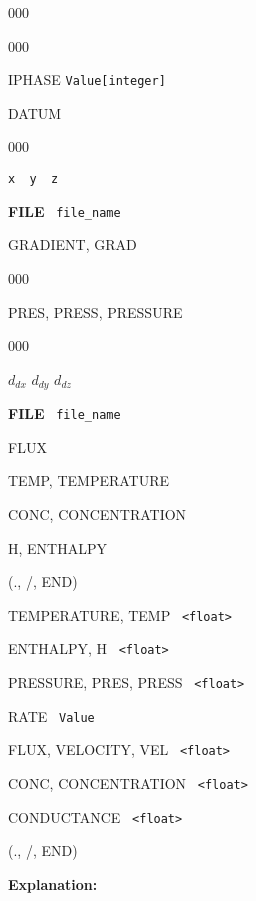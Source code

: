 \documentclass[12pt]{article}
\begin{document}
\begin{deflist}{000}
\begin{deflist}{000}
\item[IPHASE] {\tt Value[integer]}

\item[DATUM] ~
\begin{deflist}{000}
\item[{\tt x \ y \ z}]
\item[{\bf FILE} \ {\tt file\_name}]
\end{deflist}
\item[GRADIENT, GRAD] ~
\begin{deflist}{000}
\item [PRES, PRESS, PRESSURE] ~
\begin{deflist}{000}
\item[$d_{dx}$ $d_{dy}$ $d_{dz}$]
\item[{\bf FILE} \ {\tt file\_name}]
\end{deflist}
\item [FLUX]
\item [TEMP, TEMPERATURE]
\item [CONC, CONCENTRATION]
\item [H, ENTHALPY]
\end{deflist}
\item[(., /, END)]
\item[TEMPERATURE, TEMP] \ {\tt <float>}
\item[ENTHALPY, H] \ {\tt <float>}
\item[PRESSURE, PRES, PRESS] \ {\tt <float>}
\item[RATE] \ {\tt Value}
\item[FLUX, VELOCITY, VEL] \ {\tt <float>}
\item[CONC, CONCENTRATION] \ {\tt <float>}
\item[CONDUCTANCE] \ {\tt <float>}
\end{deflist}
\item[(., /, END)] ~
\end{deflist}

{\noindent\bf Explanation:}
\end{document}
